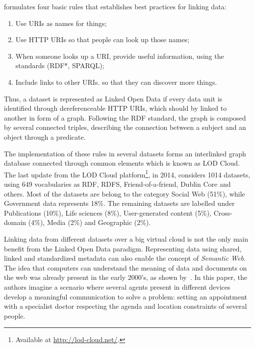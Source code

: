  formulates four basic rules that establishes best practices for linking data: 

\begin{enumerate}
	\item Use URIs as names for things;
	\item Use HTTP URIs so that people can look up those names;
	\item When someone looks up a URI, provide useful information, using the standards (RDF*, SPARQL);
	\item Include links to other URIs. so that they can discover more things.
\end{enumerate}

Thus, a dataset is represented as Linked Open Data if every data unit is identified through dereferenceable HTTP URIs, which should by linked to another in form of a graph.
Following the RDF standard, the graph is composed by several connected triples, describing the connection between a subject and an object through a predicate.

The implementation of these rules in several datasets forms an interlinked graph database connected through common elements which is known as LOD Cloud.
The last update from the LOD Cloud platform\footnote{Available at \url{http://lod-cloud.net/}.}, in 2014, considers 1014 datasets, using 649 vocabularies as RDF, RDFS, Friend-of-a-friend, Dublin Core and others.
Most of the datasets are belong to the category Social Web (51\%), while Government data represents 18\%. The remaining datasets are labelled under Publications (10\%), Life sciences (8\%), User-generated content (5\%), Cross-domain (4\%), Media (2\%) and Geographic (2\%).

Linking data from different datasets over a big virtual cloud is not the only main benefit from the Linked Open Data paradigm.
Representing data using shared, linked and standardized metadata can also enable the concept of \emph{Semantic Web}.
The idea that computers can understand the meaning of data and documents on the web was already present in the early 2000's, as shown by~. In this paper, the authors imagine a scenario where several agents present in different devices develop a meaningful communication to solve a problem: setting an appointment with a specialist doctor respecting the agenda and location constraints of several people.

